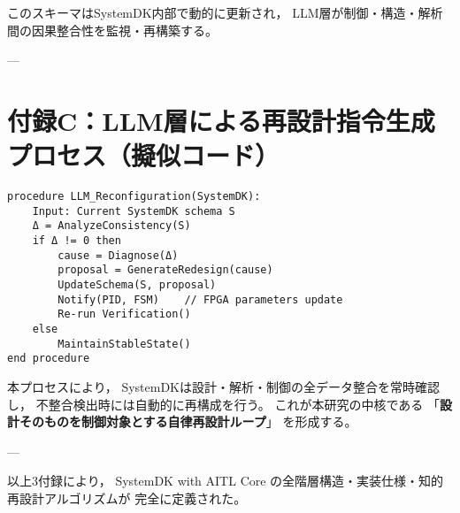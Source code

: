 このスキーマはSystemDK内部で動的に更新され，
LLM層が制御・構造・解析間の因果整合性を監視・再構築する。

---

\section*{付録C：LLM層による再設計指令生成プロセス（擬似コード）}

\begin{verbatim}
procedure LLM_Reconfiguration(SystemDK):
    Input: Current SystemDK schema S
    Δ = AnalyzeConsistency(S)
    if Δ != 0 then
        cause = Diagnose(Δ)
        proposal = GenerateRedesign(cause)
        UpdateSchema(S, proposal)
        Notify(PID, FSM)    // FPGA parameters update
        Re-run Verification()
    else
        MaintainStableState()
end procedure
\end{verbatim}

本プロセスにより，
SystemDKは設計・解析・制御の全データ整合を常時確認し，
不整合検出時には自動的に再構成を行う。
これが本研究の中核である
「\textbf{設計そのものを制御対象とする自律再設計ループ}」
を形成する。

---

\noindent
以上3付録により，
SystemDK with AITL Core の全階層構造・実装仕様・知的再設計アルゴリズムが
完全に定義された。
